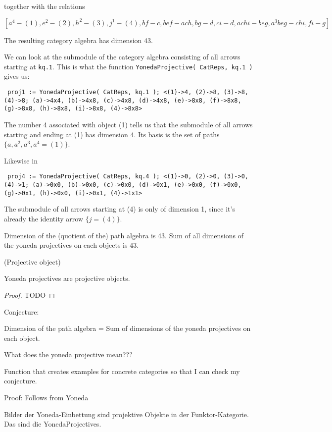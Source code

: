 together with the relations

\[
[a^{4} - (1), e^{2} - (2), h^{2} - (3), j^{1} - (4), bf - c, bef-ach, bg-d, ci-d, achi-beg, a^{3}beg-chi, fi-g]
\]

The resulting category algebra has dimension 43.

We can look at the submodule of the category algebra consisting of all arrows starting at \texttt{kq.1}.
This is what the function \texttt{YonedaProjective( CatReps, kq.1 )} gives us:

\texttt{
proj1 := YonedaProjective( CatReps, kq.1 );
<(1)->4, (2)->8, (3)->8, (4)->8; (a)->4x4, (b)->4x8, (c)->4x8,
(d)->4x8, (e)->8x8, (f)->8x8, (g)->8x8, (h)->8x8, (i)->8x8, (4)->8x8>
}

The number 4 associated with object (1) tells us that the submodule of all arrows starting and ending at (1) has dimension 4.
Its basis is the set of paths $\{a, a^{2}, a^{3}, a^{4} = (1) \}$.

Likewise in

\texttt{
proj4 := YonedaProjective( CatReps, kq.4 );
<(1)->0, (2)->0, (3)->0, (4)->1; (a)->0x0, (b)->0x0, (c)->0x0,
(d)->0x1, (e)->0x0, (f)->0x0, (g)->0x1, (h)->0x0, (i)->0x1, (4)->1x1>
}

The submodule of all arrows starting at (4) is only of dimension 1, since it's already the identity arrow $\{j = (4)\}$.

Dimension of the (quotient of the) path algebra is 43.
Sum of all dimensions of the yoneda projectives on each objects is 43.

\begin{definition}{(Projective object)}

\end{definition}

\begin{theorem}
Yoneda projectives are projective objects.
\begin{proof}
TODO
\end{proof}
\end{theorem}

Conjecture: 

Dimension of the path algebra = Sum of dimensions of the yoneda projectives on each object.

What does the yoneda projective mean???

Function that creates examples for concrete categories so that I can check my conjecture.

Proof: Follows from Yoneda

Bilder der Yoneda-Einbettung sind projektive Objekte in der Funktor-Kategorie. Das sind die YonedaProjectives.